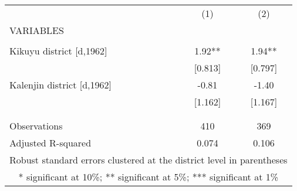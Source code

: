 \begin{tabular}{lcc} \hline
 & (1) & (2) \\
VARIABLES &  &  \\ \hline
 &  &  \\
Kikuyu district [d,1962] & 1.92** & 1.94** \\
 & [0.813] & [0.797] \\
Kalenjin district [d,1962] & -0.81 & -1.40 \\
 & [1.162] & [1.167] \\
 &  &  \\
 &  &  \\
Observations & 410 & 369 \\
 Adjusted R-squared & 0.074 & 0.106 \\ \hline
\multicolumn{3}{c}{ Robust standard errors clustered at the district level in parentheses} \\
\multicolumn{3}{c}{ * significant at 10\%; ** significant at 5\%; *** significant at 1\%} \\
\end{tabular}
